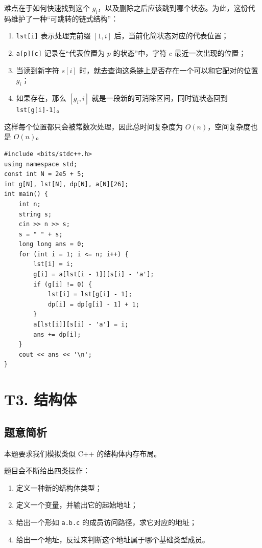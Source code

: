 \documentclass{book}
\newcommand{\code}[1]{\colorbox{codebg}{\texttt{#1}}}  %
\begin{document}
    难点在于如何快速找到这个 $g_i$，以及删除之后应该跳到哪个状态。为此，这份代码维护了一种“可跳转的链式结构”：

    \begin{enumerate}[leftmargin=2em,itemsep=1pt,topsep=2pt,parsep=0pt,partopsep=0pt]
        \item \code{lst[i]} 表示处理完前缀 $[1,i]$ 后，当前化简状态对应的代表位置；
        \item \code{a[p][c]} 记录在“代表位置为 $p$ 的状态”中，字符 $c$ 最近一次出现的位置；
        \item 当读到新字符 $s[i]$ 时，就去查询这条链上是否存在一个可以和它配对的位置 $g_i$；
        \item 如果存在，那么 $[g_i,i]$ 就是一段新的可消除区间，同时链状态回到 \code{lst[g[i]-1]}。
    \end{enumerate}

    这样每个位置都只会被常数次处理，因此总时间复杂度为 $O(n)$，空间复杂度也是 $O(n)$。

\newpage
    \begin{lstlisting}[style = code]
#include <bits/stdc++.h>
using namespace std;
const int N = 2e5 + 5;
int g[N], lst[N], dp[N], a[N][26];
int main() {
    int n;
    string s;
    cin >> n >> s;
    s = " " + s;
    long long ans = 0;
    for (int i = 1; i <= n; i++) {
        lst[i] = i;
        g[i] = a[lst[i - 1]][s[i] - 'a'];
        if (g[i] != 0) {
            lst[i] = lst[g[i] - 1];
            dp[i] = dp[g[i] - 1] + 1;
        }
        a[lst[i]][s[i] - 'a'] = i;
        ans += dp[i];
    }
    cout << ans << '\n';
}\end{lstlisting}

    \newpage
  \section{T3. 结构体} %
    
    
    \subsection{题意简析}

本题要求我们模拟类似 C++ 的结构体内存布局。

题目会不断给出四类操作：

\begin{enumerate}[leftmargin=2em,itemsep=1pt,topsep=2pt,parsep=0pt,partopsep=0pt]
    \item 定义一种新的结构体类型；
    \item 定义一个变量，并输出它的起始地址；
    \item 给出一个形如 \code{a.b.c} 的成员访问路径，求它对应的地址；
    \item 给出一个地址，反过来判断这个地址属于哪个基础类型成员。
\end{enumerate}
\end{document}
